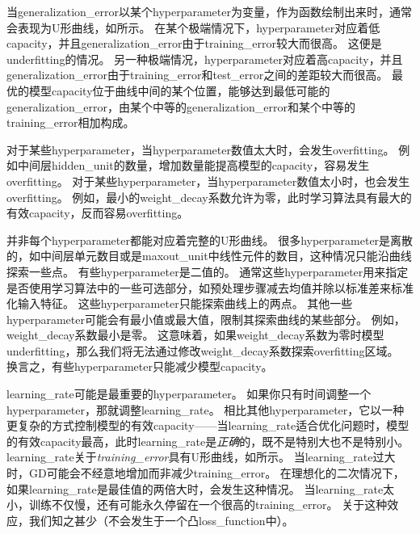 

当\gls{generalization_error}以某个\gls{hyperparameter}为变量，作为函数绘制出来时，通常会表现为U形曲线，如所示。
在某个极端情况下，\gls{hyperparameter}对应着低\gls{capacity}，并且\gls{generalization_error}由于\gls{training_error}较大而很高。
这便是\gls{underfitting}的情况。
另一种极端情况，\gls{hyperparameter}对应着高\gls{capacity}，并且\gls{generalization_error}由于\gls{training_error}和\gls{test_error}之间的差距较大而很高。
最优的模型\gls{capacity}位于曲线中间的某个位置，能够达到最低可能的\gls{generalization_error}，由某个中等的\gls{generalization_error}和某个中等的\gls{training_error}相加构成。



对于某些\gls{hyperparameter}，当\gls{hyperparameter}数值太大时，会发生\gls{overfitting}。
例如中间层\gls{hidden_unit}的数量，增加数量能提高模型的\gls{capacity}，容易发生\gls{overfitting}。%
对于某些\gls{hyperparameter}，当\gls{hyperparameter}数值太小时，也会发生\gls{overfitting}。
例如，最小的\gls{weight_decay}系数允许为零，此时学习算法具有最大的有效\gls{capacity}，反而容易\gls{overfitting}。%


并非每个\gls{hyperparameter}都能对应着完整的U形曲线。
很多\gls{hyperparameter}是离散的，如中间层单元数目或是\gls{maxout_unit}中线性元件的数目，这种情况只能沿曲线探索一些点。
有些\gls{hyperparameter}是二值的。
通常这些\gls{hyperparameter}用来指定是否使用学习算法中的一些可选部分，如预处理步骤减去均值并除以标准差来标准化输入特征。
这些\gls{hyperparameter}只能探索曲线上的两点。
其他一些\gls{hyperparameter}可能会有最小值或最大值，限制其探索曲线的某些部分。%
例如，\gls{weight_decay}系数最小是零。
这意味着，如果\gls{weight_decay}系数为零时模型\gls{underfitting}，那么我们将无法通过修改\gls{weight_decay}系数探索\gls{overfitting}区域。
换言之，有些\gls{hyperparameter}只能减少模型\gls{capacity}。


\gls{learning_rate}可能是最重要的\gls{hyperparameter}。
如果你只有时间调整一个\gls{hyperparameter}，那就调整\gls{learning_rate}。
相比其他\gls{hyperparameter}，它以一种更复杂的方式控制模型的有效\gls{capacity}——当\gls{learning_rate}适合优化问题时，模型的有效\gls{capacity}最高，此时\gls{learning_rate}是\emph{正确}的，既不是特别大也不是特别小。
\gls{learning_rate}关于\emph{\gls{training_error}}具有U形曲线，如所示。
当\gls{learning_rate}过大时，\gls{GD}可能会不经意地增加而非减少\gls{training_error}。
在理想化的二次情况下，如果\gls{learning_rate}是最佳值的两倍大时，会发生这种情况\citep{LeCun+98backprop-small}。
当\gls{learning_rate}太小，训练不仅慢，还有可能永久停留在一个很高的\gls{training_error}。
关于这种效应，我们知之甚少（不会发生于一个凸\gls{loss_function}中）。


